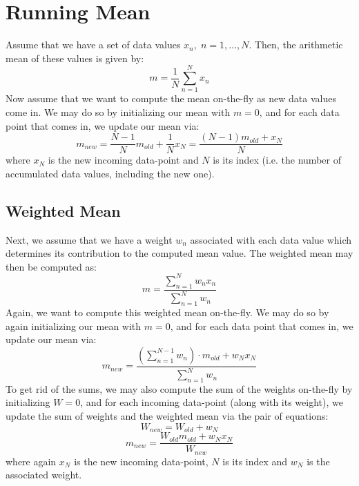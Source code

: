 \section{Running Mean}
Assume that we have a set of data values $x_n, \; n=1,\ldots,N$. Then, the arithmetic mean of these values is given by:
\begin{equation}
 m = \frac{1}{N} \sum_{n=1}^N x_n
\end{equation}
Now assume that we want to compute the mean on-the-fly as new data values come in. We may do so by initializing our mean with $m=0$, and for each data point that comes in, we update our mean via:
\begin{equation}
 m_{new} = \frac{N-1}{N} m_{old} + \frac{1}{N} x_N = \frac{(N-1) m_{old} + x_N}{N}
\end{equation}
where $x_N$ is the new incoming data-point and $N$ is its index (i.e. the number of accumulated data values, including the new one).

\subsection{Weighted Mean}
Next, we assume that we have a weight $w_n$ associated with each data value which determines its contribution to the computed mean value. The weighted mean may then be computed as:
\begin{equation}
 m = \frac{\sum_{n=1}^N w_n x_n}{\sum_{n=1}^N w_n}
\end{equation}
Again, we want to compute this weighted mean on-the-fly. We may do so by again initializing our mean with $m=0$, and for each data point that comes in, we update our mean via:
\begin{equation}
 m_{new} = \frac{ (\sum_{n=1}^{N-1} w_n) \cdot m_{old} + w_N x_N}{\sum_{n=1}^N w_n}
\end{equation}
To get rid of the sums, we may also compute the sum of the weights on-the-fly by initializing $W=0$, and for each incoming data-point (along with its weight), we update the sum of weights and the weighted mean via the pair of equations:
\begin{equation}
 W_{new} = W_{old} + w_N
\end{equation}
\begin{equation}
 m_{new} = \frac{ W_{old} m_{old} + w_N x_N}{W_{new}}
\end{equation}
where again $x_N$ is the new incoming data-point, $N$ is its index and $w_N$ is the associated weight.











